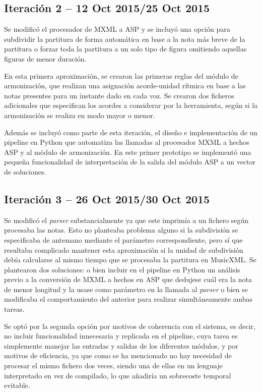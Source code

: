 \subsection{Iteración 2  -- 12 Oct 2015/25 Oct 2015}
\label{sec:second_iteration}
Se modificó el procesador de MXML a ASP y se incluyó una opción para subdividir la partitura de forma automática en base a la nota más breve de la partitura o forzar toda la partitura a un solo tipo de figura omitiendo aquellas figuras de menor duración.

En esta primera aproximación, se crearon las primeras reglas del módulo de armonización, que realizan una asignación acorde-unidad rítmica en base a las notas presentes para un instante dado en cada voz. Se crearon dos ficheros adicionales que especifican los acordes a considerar por la herramienta, según si la armonización se realiza en modo mayor o menor. 

Además se incluyó como parte de esta iteración, el diseño e implementación de un pipeline en Python que automatiza las llamadas al procesador MXML a hechos ASP y al módulo de armonización. En este primer prototipo se implementó una pequeña funcionalidad de interpretación de la salida del módulo ASP a un vector de soluciones.


\subsection{Iteración 3  -- 26 Oct 2015/30 Oct 2015}
\label{subsec:third_iteration}
Se modificó el \textit{parser} substancialmente ya que este imprimía a un fichero según procesaba las notas. Esto no planteaba problema alguno si la subdivisión se especificaba de antemano mediante el parámetro correspondiente, pero sí que resultaba complicado mantener esta aproximación si la unidad de subdivisión debía calcularse al mismo tiempo que se procesaba la partitura en MusicXML. Se plantearon dos soluciones: o bien incluir en el pipeline en Python un análisis previo a la conversión de MXML a hechos en ASP que dedujese cuál era la nota de menor longitud y la usase como parámetro en la llamada al \textit{parser} o bien se modificaba el comportamiento del anterior para realizar simultáneamente ambas tareas. 

Se optó por la segunda opción por motivos de coherencia con el sistema, es decir, no incluir funcionalidad innecesaria y replicada en el pipeline, cuya tarea es simplemente manejar las entradas y salidas de los diferentes módulos, y por motivos de eficiencia, ya que como se ha mencionado no hay necesidad de procesar el mismo fichero dos veces, siendo una de ellas en un lenguaje interpretado en vez de compilado, lo que añadiría un sobrecoste temporal evitable.

